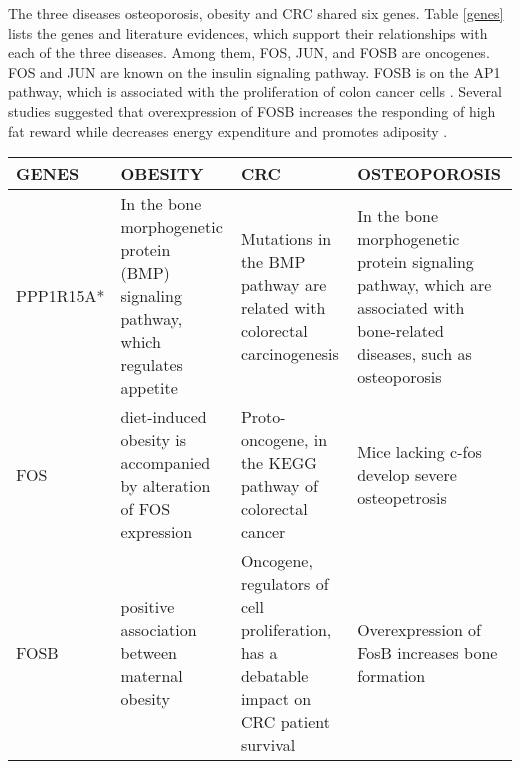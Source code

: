The three diseases osteoporosis, obesity and CRC shared six genes. Table \ref{genes} lists the genes and literature evidences, which support their relationships with each of the three diseases. Among them, FOS, JUN, and FOSB are oncogenes. FOS and JUN are known on the insulin signaling pathway. FOSB is on the AP1 pathway, which is associated with the proliferation of colon cancer cells \cite{ashida2005ap}.
Several studies suggested that overexpression of FOSB increases the responding of high fat reward while decreases energy expenditure and promotes adiposity \cite{thakali2014maternal,vialou2011role}.
\begin{sidewaystable}[h]
\caption{C\lowercase{OMMON GENES SHARED BY OBESITY, COLORECTAL CANCER AND OSTEOPOROSIS, AND PLAUSIBLE EVIDENCE SUPPORTING THEIR RELATIONSHIPS WITH THE THREE DISEASES}.}
\label{genes}
\centering
\begin{tabular}{l|m{4.5cm}|m{4.5cm}|m{4.5cm}}
GENES     & OBESITY                                                                                                                                                   & CRC                                                                                                 & OSTEOPOROSIS                                                                                                                        \\\hline
PPP1R15A* & In the bone morphogenetic protein (BMP) signaling pathway, which regulates appetite \cite{townsend2012bone}                                                              & Mutations in the BMP pathway are related with colorectal carcinogenesis \cite{hardwick2008bone}                 & In the bone morphogenetic protein signaling pathway, which are associated with bone-related diseases, such as osteoporosis \cite{chen2012tgf} \\
FOS       & diet-induced obesity is accompanied by alteration of FOS expression \cite{parker2013glucagon}                                                                    & Proto-oncogene, in the KEGG pathway of colorectal cancer \cite{kanehisa2000kegg}                                   & Mice lacking c-fos develop severe osteopetrosis \cite{okada1994mice}                                                                         \\
FOSB      & positive association between maternal obesity \cite{thakali2014maternal}                                                                                                   & Oncogene, regulators of cell proliferation, has a debatable impact on CRC patient survival \cite{pfannschmidt2009identification} & Overexpression of FosB increases bone formation \cite{sabatakos2000overexpression}                                                                           \\

\end{tabular}
\end{sidewaystable}
